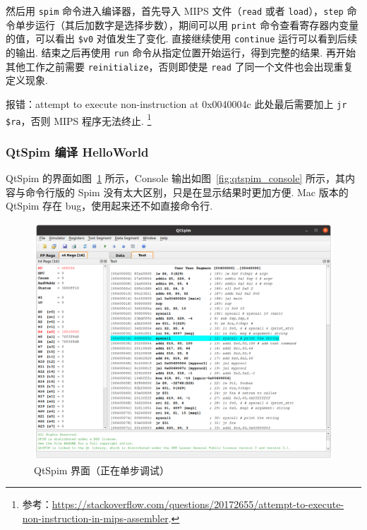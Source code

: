 \documentclass[11pt]{SEU-Digital-Report}
\begin{document}
      然后用 \texttt{spim} 命令进入编译器，首先导入 MIPS 文件（\texttt{read} 或者 \texttt{load}），\texttt{step} 命令单步运行（其后加数字是选择步数），期间可以用 \texttt{print} 命令查看寄存器内变量的值，可以看出 \texttt{\$v0} 对值发生了变化.
      直接继续使用 \texttt{continue} 运行可以看到后续的输出.
      结束之后再使用 \texttt{run} 命令从指定位置开始运行，得到完整的结果.
      再开始其他工作之前需要 \texttt{reinitialize}，否则即使是 \texttt{read} 了同一个文件也会出现重复定义现象.

      \begin{note}{报错：{\normalfont\ttfamily attempt to execute non-instruction at 0x0040004c}}{}
        此处最后需要加上 \texttt{jr \$ra}，否则 MIPS 程序无法终止.
        \footnote{参考：\url{https://stackoverflow.com/questions/20172655/attempt-to-execute-non-instruction-in-mips-assembler}.}
      \end{note}

      \subsubsection{QtSpim 编译 HelloWorld}

      QtSpim 的界面如图~\ref{fig:qt_spim} 所示，Console 输出如图~\ref{fig:qtspim_console} 所示，其内容与命令行版的 Spim 没有太大区别，只是在显示结果时更加方便.
      Mac 版本的 QtSpim 存在 bug，使用起来还不如直接命令行.

      \begin{figure}[t!]
        \centering
        \includegraphics[width=\linewidth]{fig/spim/qt_spim.png}
        \caption{QtSpim 界面（正在单步调试）}
        \label{fig:qt_spim}
      \end{figure}
\end{document}
